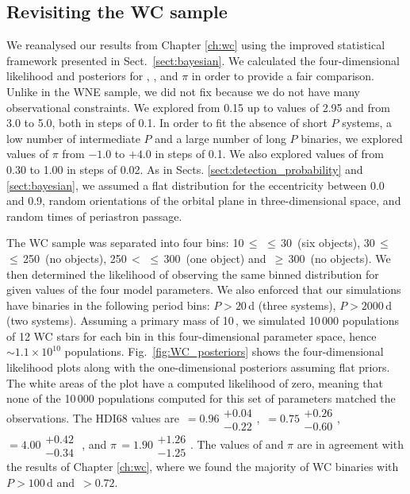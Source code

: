 \subsection{Revisiting the WC sample}
\label{sect:WC_bayesian}
We reanalysed our results from Chapter \ref{ch:wc} using the improved statistical framework presented in Sect.~\ref{sect:bayesian}. We calculated the four-dimensional likelihood and posteriors for \logPmin{}, \logPmax{}, \fintWNE{} and $\pi$ in order to provide a fair comparison. Unlike in the WNE sample, we did not fix \Pmin{} because we do not have many observational constraints. We explored \logPmin{} from 0.15 up to values of 2.95 and \logPmax{} from 3.0 to 5.0, both in steps of 0.1. In order to fit the absence of short $P$ systems, a low number of intermediate $P$ and a large number of long $P$ binaries, we explored values of $\pi$ from $-1.0$ to $+4.0$ in steps of 0.1. We also explored values of \fintWC{} from 0.30 to 1.00 in steps of 0.02. As in Sects. \ref{sect:detection_probability} and \ref{sect:bayesian}, we assumed a flat distribution for the eccentricity between 0.0 and 0.9, random orientations of the orbital plane in three-dimensional space, and random times of periastron passage.

The WC sample was separated into four \DelRV{} bins: 10\,$\le$\,\DelRV{}\,$\le$\,30\,\kms{} (six objects), 30\,$\le$\,\DelRV{}\,$\le$\,250\,\kms{} (no objects), 250\,$<$\,\DelRV{}\,$\le$\,300\,\kms{} (one object) and  \DelRV{}\,$\ge$\,300\,\kms{} (no objects). We then determined the likelihood of observing the same binned distribution for given values of the four model parameters. We also enforced that our simulations have binaries in the following period bins: $P > 20$\,d (three systems), $P > 2000$\,d (two systems). Assuming a primary mass of 10\,\Msun{}, we simulated 10\,000 populations of 12 WC stars for each bin in this four-dimensional parameter space, hence $\sim 1.1\times10^{10}$ populations. Fig.~\ref{fig:WC_posteriors} shows the four-dimensional likelihood plots along with the one-dimensional posteriors assuming flat priors. The white areas of the plot have a computed likelihood of zero, meaning that none of the 10\,000 populations computed for this set of parameters matched the observations. The HDI68 values are \fintWC{}\,$= 0.96\substack{+0.04 \\ -0.22}$, \logPmin{}\,$= 0.75\substack{+0.26 \\ -0.60}$, \logPmax{}\,$= 4.00\substack{+0.42 \\ -0.34}$ , and $\pi$\,$= 1.90\substack{+1.26 \\ -1.25}$. The values of \fintWC{} and $\pi$ are in agreement with the results of Chapter \ref{ch:wc}, where we found the majority of WC binaries with $P>100$\,d and \fintWC{}\,$> 0.72$.

